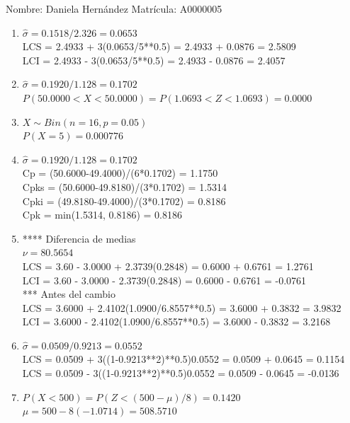 \documentclass[8pt]{report}
\begin{document}
 \newpage

Nombre: \underline{\hspace*{.2in}}
Daniela Hernández
\underline{\hspace*{.2in}} \quad Matr\'icula:\underline{\hspace*{.2in}}
A0000005
\underline{\hspace*{.2in}} \\

\begin{enumerate}
\item $\hat\sigma = 0.1518/2.326 = 0.0653$\\
LCS = 2.4933 + 3(0.0653/5**0.5) = 2.4933 + 0.0876 = 2.5809\\
LCI = 2.4933 - 3(0.0653/5**0.5) = 2.4933 - 0.0876 = 2.4057
\item $\hat\sigma = 0.1920/1.128 = 0.1702$\\
$P(50.0000 < X < 50.0000) = P(1.0693 < Z < 1.0693) = 0.0000$\\
\item $X \sim Bin(n=16, p=0.05)$\\
$P(X = 5) = 0.000776$
\item $\hat\sigma = 0.1920/1.128 = 0.1702$\\
Cp = (50.6000-49.4000)/(6*0.1702) = 1.1750\\
Cpks = (50.6000-49.8180)/(3*0.1702) = 1.5314\\
Cpki = (49.8180-49.4000)/(3*0.1702) = 0.8186\\
Cpk = min(1.5314, 0.8186) = 0.8186
\item **** Diferencia de medias\\
$\nu = 80.5654$\\
LCS = 3.60 - 3.0000 + 2.3739(0.2848) = 0.6000 + 0.6761 = 1.2761\\
LCI = 3.60 - 3.0000 - 2.3739(0.2848) = 0.6000 - 0.6761 = -0.0761\\
*** Antes del cambio\\
LCS = 3.6000 + 2.4102(1.0900/6.8557**0.5) = 3.6000 + 0.3832 = 3.9832\\
LCI = 3.6000 - 2.4102(1.0900/6.8557**0.5) = 3.6000 - 0.3832 = 3.2168\\
\item $\hat\sigma = 0.0509/0.9213 = 0.0552$\\
LCS = 0.0509 + 3((1-0.9213**2)**0.5)0.0552 = 0.0509 + 0.0645 = 0.1154\\
LCS = 0.0509 - 3((1-0.9213**2)**0.5)0.0552 = 0.0509 - 0.0645 = -0.0136
\item $P(X < 500) = P(Z < (500-\mu)/8) = 0.1420$\\
$\mu = 500 - 8(-1.0714) = 508.5710$\\
\end{enumerate}
\end{document}
